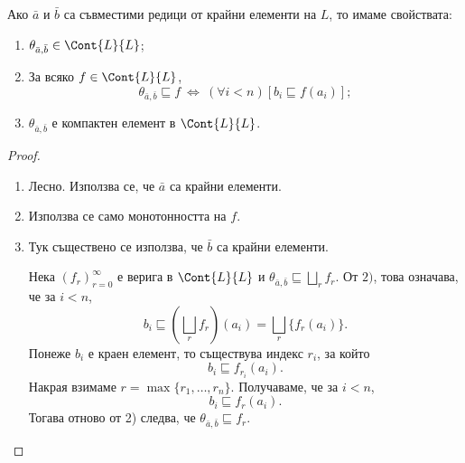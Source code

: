 \begin{prop}
  Ако $\bar{a}$ и $\bar{b}$ са съвместими редици от крайни елементи на $L$, то имаме свойствата:
  \begin{enumerate}[1)]
  \item 
    $\theta_{\bar{a},\bar{b}} \in \Cont{L}{L}$;
  \item
    За всяко $f \in \Cont{L}{L}$, 
    \[\theta_{\bar{a},\bar{b}} \sqsubseteq f\ \iff\ (\forall i < n)[b_i \sqsubseteq f(a_i)];\]
  \item
    $\theta_{\bar{a},\bar{b}}$ е компактен елемент в $\Cont{L}{L}$.
  \end{enumerate}
\end{prop}
\begin{proof}
  \begin{enumerate}[1)]
  \item 
    Лесно. Използва се, че $\bar{a}$ са крайни елементи.
  \item
    Използва се само монотонността на $f$.
  \item
    Тук съществено се използва, че $\bar{b}$ са крайни елементи.

    Нека $(f_r)^\infty_{r=0}$ е верига в $\Cont{L}{L}$ и 
    $\theta_{\bar{a},\bar{b}} \sqsubseteq \bigsqcup_r f_r$.
    От $2)$, това означава, че за $i < n$,
    \[b_i \sqsubseteq (\bigsqcup_r f_r)(a_i) = \bigsqcup_r \{f_r(a_i)\}.\]
    Понеже $b_i$ е краен елемент, то съществува индекс $r_i$, за който
    \[b_i \sqsubseteq f_{r_i}(a_i).\]
    Накрая взимаме $r = \max\{r_1,\dots,r_n\}$.
    Получаваме, че за $i < n$,
    \[b_i \sqsubseteq f_{r}(a_i).\]
    Тогава отново от 2) следва, че $\theta_{\bar{a},\bar{b}} \sqsubseteq f_r$.
  \end{enumerate}
\end{proof}

